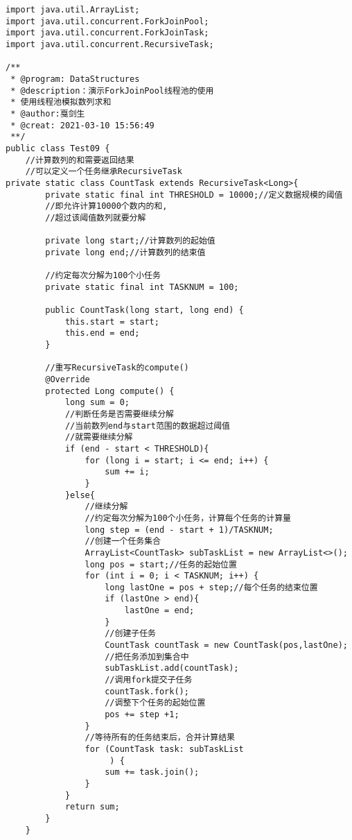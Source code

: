 \documentclass[a4paper]{report}
\begin{document}
\begin{Verbatim}[frame=single,numbersep=5pt,xleftmargin=1.5em,xrightmargin=1.5em]
import java.util.ArrayList;
import java.util.concurrent.ForkJoinPool;
import java.util.concurrent.ForkJoinTask;
import java.util.concurrent.RecursiveTask;

/**
 * @program: DataStructures
 * @description：演示ForkJoinPool线程池的使用
 * 使用线程池模拟数列求和
 * @author:戛剑生
 * @creat: 2021-03-10 15:56:49
 **/
public class Test09 {
    //计算数列的和需要返回结果
    //可以定义一个任务继承RecursiveTask
private static class CountTask extends RecursiveTask<Long>{
        private static final int THRESHOLD = 10000;//定义数据规模的阈值
        //即允许计算10000个数内的和,
        //超过该阈值数列就要分解

        private long start;//计算数列的起始值
        private long end;//计算数列的结束值

        //约定每次分解为100个小任务
        private static final int TASKNUM = 100;

        public CountTask(long start, long end) {
            this.start = start;
            this.end = end;
        }

        //重写RecursiveTask的compute()
        @Override
        protected Long compute() {
            long sum = 0;
            //判断任务是否需要继续分解
            //当前数列end与start范围的数据超过阈值
            //就需要继续分解
            if (end - start < THRESHOLD){
                for (long i = start; i <= end; i++) {
                    sum += i;
                }
            }else{
                //继续分解
                //约定每次分解为100个小任务，计算每个任务的计算量
                long step = (end - start + 1)/TASKNUM;
                //创建一个任务集合
                ArrayList<CountTask> subTaskList = new ArrayList<>();
                long pos = start;//任务的起始位置
                for (int i = 0; i < TASKNUM; i++) {
                    long lastOne = pos + step;//每个任务的结束位置
                    if (lastOne > end){
                        lastOne = end;
                    }
                    //创建子任务
                    CountTask countTask = new CountTask(pos,lastOne);
                    //把任务添加到集合中
                    subTaskList.add(countTask);
                    //调用fork提交子任务
                    countTask.fork();
                    //调整下个任务的起始位置
                    pos += step +1;
                }
                //等待所有的任务结束后，合并计算结果
                for (CountTask task: subTaskList
                     ) {
                    sum += task.join();
                }
            }
            return sum;
        }
    }


\end{Verbatim}
\end{document}
